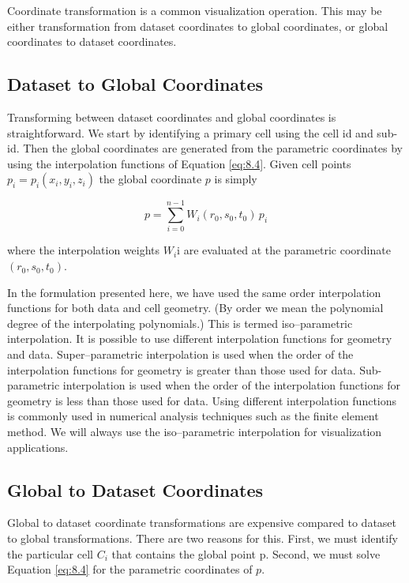 Coordinate transformation is a common visualization operation. This may be either transformation from dataset coordinates to global coordinates, or global coordinates to dataset coordinates.

\subsection{Dataset to Global Coordinates}

Transforming between dataset coordinates and global coordinates is straightforward. We start by identifying a primary cell using the cell id and sub-id. Then the global coordinates are generated from the parametric coordinates by using the interpolation functions of Equation \ref{eq:8.4}. Given cell points $p_i = p_i(x_i, y_i, z_i)$ the global coordinate $p$ is simply

\begin{equation}\label{eq:8.8}
p = \sum_{i = 0}^{n - 1} W_i(r_0, s_0, t_0)\, p_i
\end{equation}

where the interpolation weights $W_i$i are evaluated at the parametric coordinate $(r_0, s_0, t_0)$.

In the formulation presented here, we have used the same order interpolation functions for both data and cell geometry. (By order we mean the polynomial degree of the interpolating polynomials.) This is termed iso--parametric interpolation. It is possible to use different interpolation functions for geometry and data. Super--parametric interpolation is used when the order of the interpolation functions for geometry is greater than those used for data. Sub-parametric interpolation is used when the order of the interpolation functions for geometry is less than those used for data. Using different interpolation functions is commonly used in numerical analysis techniques such as the finite element method. We will always use the iso--parametric interpolation for visualization applications.

\subsection{Global to Dataset Coordinates}

Global to dataset coordinate transformations are expensive compared to dataset to global transformations. There are two reasons for this. First, we must identify the particular cell $C_i$ that contains the global point p. Second, we must solve Equation \ref{eq:8.4} for the parametric coordinates of $p$.

